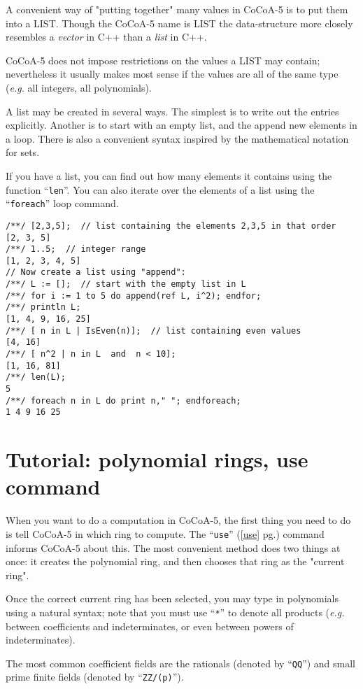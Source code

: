 \documentclass[a4paper]{mybook}
\begin{document}
        
A convenient way of "putting together" many values in CoCoA-5
is to put them into a LIST.  Though the CoCoA-5 name is LIST
the data-structure more closely resembles a \textit{vector} in C++
than a \textit{list} in C++.
\par 
CoCoA-5 does not impose restrictions on the values a LIST may
contain; nevertheless it usually makes most sense if the values
are all of the same type (\textit{e.g.} all integers, all polynomials).
\par 
A list may be created in several ways.  The simplest is to write
out the entries explicitly.  Another is to start with an empty list,
and the append new elements in a loop.  There is also a convenient
syntax inspired by the mathematical notation for sets.
\par 
If you have a list, you can find out how many elements it contains
using the function ``\verb&len&''.  You can also iterate over the
elements of a list using the ``\verb&foreach&'' loop command.
\begin{Verbatim}[label=example, rulecolor=\color{PineGreen}, frame=single]
/**/ [2,3,5];  // list containing the elements 2,3,5 in that order
[2, 3, 5]
/**/ 1..5;  // integer range
[1, 2, 3, 4, 5]
// Now create a list using "append":
/**/ L := [];  // start with the empty list in L
/**/ for i := 1 to 5 do append(ref L, i^2); endfor;
/**/ println L;
[1, 4, 9, 16, 25]
/**/ [ n in L | IsEven(n)];  // list containing even values
[4, 16]
/**/ [ n^2 | n in L  and  n < 10];
[1, 16, 81]
/**/ len(L);
5
/**/ foreach n in L do print n," "; endforeach;
1 4 9 16 25
\end{Verbatim}



\section{Tutorial: polynomial rings, use command}
\label{Tutorial: polynomial rings, use command}

        
When you want to do a computation in CoCoA-5, the first thing you
need to do is tell CoCoA-5 in which ring to compute.  The ``\verb&use&'' (\ref{use} pg.\pageref{use})
command informs CoCoA-5 about this.  The most convenient method does
two things at once: it creates the polynomial ring, and then chooses
that ring as the "current ring".
\par 
Once the correct current ring has been selected, you may type in
polynomials using a natural syntax; note that you must use ``\verb&*&'' to
denote all products (\textit{e.g.} between coefficients and indeterminates,
or even between powers of indeterminates).
\par 
The most common coefficient fields are the rationals (denoted by ``\verb&QQ&'')
and small prime finite fields (denoted by ``\verb&ZZ/(p)&'').
\end{document}

